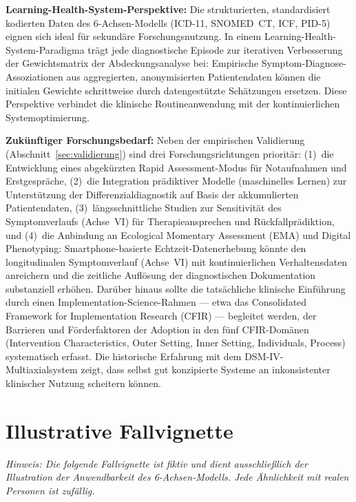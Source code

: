 \documentclass[11pt,a4paper]{article}
\begin{document}
\textbf{Learning-Health-System-Perspektive:} Die strukturierten, standardisiert kodierten Daten des 6-Achsen-Modells (ICD-11, SNOMED~CT, ICF, PID-5) eignen sich ideal f\"ur sekund\"are Forschungsnutzung. In einem Learning-Health-System-Paradigma tr\"agt jede diagnostische Episode zur iterativen Verbesserung der Gewichtsmatrix der Abdeckungsanalyse bei: Empirische Symptom-Diagnose-Assoziationen aus aggregierten, anonymisierten Patientendaten k\"onnen die initialen Gewichte schrittweise durch datengest\"utzte Sch\"atzungen ersetzen. Diese Perspektive verbindet die klinische Routineanwendung mit der kontinuierlichen Systemoptimierung.

\textbf{Zuk\"unftiger Forschungsbedarf:} Neben der empirischen Validierung (Abschnitt~\ref{sec:validierung}) sind drei Forschungsrichtungen priorit\"ar: (1)~die Entwicklung eines abgek\"urzten \glqq Rapid Assessment\grqq{}-Modus f\"ur Notaufnahmen und Erstgespr\"ache, (2)~die Integration pr\"adiktiver Modelle (maschinelles Lernen) zur Unterst\"utzung der Differenzialdiagnostik auf Basis der akkumulierten Patientendaten, (3)~l\"angsschnittliche Studien zur Sensitivit\"at des Symptomverlaufs (Achse~VI) f\"ur Therapieansprechen und R\"uckfallpr\"adiktion, und (4)~die Anbindung an Ecological Momentary Assessment (EMA) und Digital Phenotyping: Smartphone-basierte Echtzeit-Datenerhebung k\"onnte den longitudinalen Symptomverlauf (Achse~VI) mit kontinuierlichen Verhaltensdaten anreichern und die zeitliche Aufl\"osung der diagnostischen Dokumentation substanziell erh\"ohen. Dar\"uber hinaus sollte die tats\"achliche klinische Einf\"uhrung durch einen Implementation-Science-Rahmen --- etwa das Consolidated Framework for Implementation Research (CFIR) --- begleitet werden, der Barrieren und F\"orderfaktoren der Adoption in den f\"unf CFIR-Dom\"anen (Intervention Characteristics, Outer Setting, Inner Setting, Individuals, Process) systematisch erfasst. Die historische Erfahrung mit dem DSM-IV-Multiaxialsystem zeigt, dass selbst gut konzipierte Systeme an inkonsistenter klinischer Nutzung scheitern k\"onnen.


\section{Illustrative Fallvignette}
\label{sec:fallvignette}

\textit{Hinweis: Die folgende Fallvignette ist fiktiv und dient ausschlie\ss{}lich der Illustration der Anwendbarkeit des 6-Achsen-Modells. Jede \"Ahnlichkeit mit realen Personen ist zuf\"allig.}
\end{document}
